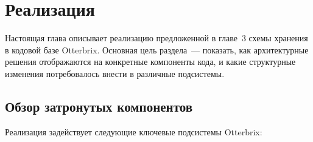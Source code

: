 \chapter{Реализация}\label{ch:impl}

Настоящая глава описывает реализацию предложенной в главе~3 схемы
хранения в кодовой базе Otterbrix. Основная цель раздела~--- показать,
как архитектурные решения отображаются на конкретные компоненты
кода, и какие структурные изменения потребовалось внести в
различные подсистемы.

\section{Обзор затронутых компонентов}

Реализация задействует следующие ключевые подсистемы Otterbrix:

